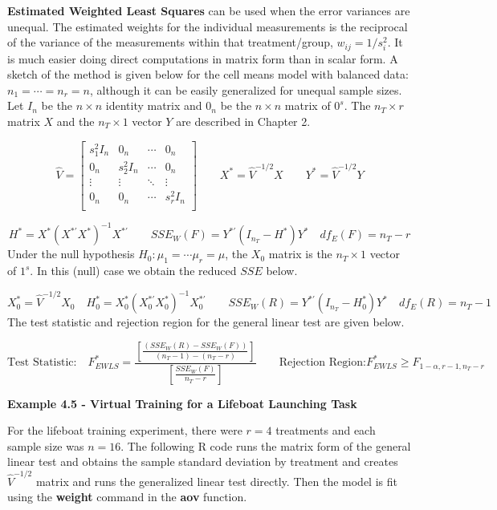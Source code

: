 \documentclass[
]{book}
\begin{document}
\textbf{Estimated Weighted Least Squares} can be used when the error
variances are unequal. The estimated weights for the individual
measurements is the reciprocal of the variance of the measurements
within that treatment/group, \(w_{ij}=1/s_i^2\). It is much easier doing
direct computations in matrix form than in scalar form. A sketch of the
method is given below for the cell means model with balanced data:
\(n_1=\cdots=n_r=n\), although it can be easily generalized for unequal
sample sizes. Let \(I_n\) be the \(n\times n\) identity matrix and
\(0_n\) be the \(n\times n\) matrix of \(0^s\). The \(n_T\times r\)
matrix \(X\) and the \(n_T\times 1\) vector \(Y\) are described in
Chapter 2.

\[
\hat{V}=
\begin{bmatrix}
s_1^2I_n & 0_n & \cdots & 0_n \\
0_n & s_2^2I_n & \cdots & 0_n \\
\vdots & \vdots & \ddots & \vdots \\
0_n & 0_n & \cdots & s_r^2I_n \\
\end{bmatrix}
\qquad
X^*=\hat{V}^{-1/2}X
\qquad
Y^*=\hat{V}^{-1/2}Y
\]

\[
H^*=
X^*\left(X^{*'}X^*\right)
^{-1}X^{*'} 
\qquad
SSE_W(F)=Y^{*'}\left(I_{n_T}-H^*\right)Y^* \quad df_E(F)=n_T-r
\] Under the null hypothesis \(H_0:\mu_1=\cdots\mu_r=\mu\), the \(X_0\)
matrix is the \(n_T\times 1\) vector of \(1^s\). In this (null) case we
obtain the reduced \(SSE\) below.

\[
X_0^*=\hat{V}^{-1/2}X_0 \quad 
H_0^*=
X_0^*\left(X_0^{*'}X_0^*\right)
^{-1}X_0^{*'} 
\qquad
SSE_W(R)=Y^{*'}\left(I_{n_T}-H_0^*\right)Y^* \quad df_E(R)=n_T-1
\] The test statistic and rejection region for the general linear test
are given below.

\[
\mbox{Test Statistic:} \quad F_{EWLS}^*=
\frac{ \left[\frac{\left(SSE_W(R)-SSE_W(F)\right)}
      {\left(n_T-1\right)-\left(n_T-r\right)}\right]}
      {\left[\frac{SSE_W(F)}{n_T-r}\right]}
\qquad
\mbox{Rejection Region:} F_{EWLS}^* \ge F_{1-\alpha,r-1,n_T-r}
\]

\textbf{Example 4.5 - Virtual Training for a Lifeboat Launching Task}

For the lifeboat training experiment, there were \(r=4\) treatments and
each sample size was \(n=16\). The following R code runs the matrix form
of the general linear test and obtains the sample standard deviation by
treatment and creates \(\hat{V}^{-1/2}\) matrix and runs the generalized
linear test directly. Then the model is fit using the \textbf{weight}
command in the \textbf{aov} function.
\end{document}
